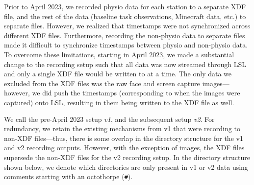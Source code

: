 Prior to April 2023, we recorded physio data for each station to a separate
XDF file, and the rest of the data (baseline task observations, Minecraft data,
etc.) to separate files. However, we realized that timestamps were not
synchronized across different XDF files. Furthermore, recording the non-physio
data to separate files made it difficult to synchronize timestamps between
physio and non-physio data. To overcome these limitations, starting in April
2023, we made a substantial change to the recording setup such that all data
was now streamed through LSL and only a single XDF file would be written to at
a time. The only data we excluded from the XDF files was the raw face and screen
capture images---however, we did push the timestamps (corresponding to when the
images were captured) onto LSL, resulting in them being written to the XDF file
as well.

We call the pre-April 2023 setup \emph{v1}, and the subsequent setup \emph{v2}.
For redundancy, we retain the existing mechanisms from v1 that were
recording to non-XDF files---thus, there is some overlap in the directory
structure for the v1 and v2 recording outputs. However, with the exception of
images, the XDF files supersede the non-XDF files for the v2 recording setup.
In the directory structure shown below, we denote which directories are only
present in v1 or v2 data using comments starting with an octothorpe (\verb|#|).

